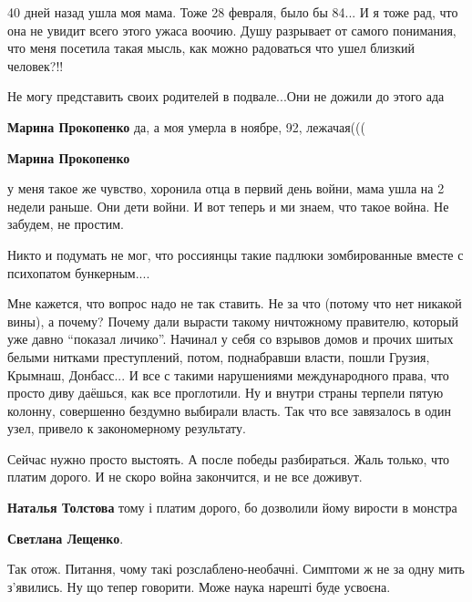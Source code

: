 \begin{itemize}
\begin{itemize}
40 дней назад ушла моя мама. Тоже 28 февраля, было бы 84... И я тоже рад, что
она не увидит всего этого ужаса воочию. Душу разрывает от самого понимания, что
меня посетила такая мысль, как можно радоваться что ушел близкий человек?!!


Не могу представить своих родителей в подвале...Они не дожили до этого ада

\textbf{Марина Прокопенко} да, а моя умерла в ноябре, 92, лежачая(((

\textbf{Марина Прокопенко} 

у меня такое же чувство, хоронила отца в первий день войни, мама ушла на 2
недели раньше. Они дети войни. И вот теперь и ми знаем, что такое война. Не
забудем, не простим.

\end{itemize} %


Никто и подумать не мог, что россиянцы такие падлюки зомбированные вместе с
психопатом бункерным....


Мне кажется, что вопрос надо не так ставить. Не за что (потому что нет никакой
вины), а почему? Почему дали вырасти такому ничтожному правителю, который уже
давно \enquote{показал личико}. Начинал у себя со взрывов домов и прочих шитых белыми
нитками преступлений, потом, поднабравши власти, пошли Грузия, Крымнаш,
Донбасс... И все с такими нарушениями международного права, что просто диву
даёшься, как все проглотили. Ну и внутри страны терпели пятую колонну,
совершенно бездумно выбирали власть. Так что все завязалось в один узел,
привело к закономерному результату.

Сейчас нужно просто выстоять. А после победы разбираться. Жаль только, что
платим дорого. И не скоро война закончится, и не все доживут.

\begin{itemize} %
\textbf{Наталья Толстова} тому і платим дорого, бо дозволили йому вирости в монстра

\textbf{Светлана Лещенко}. 

Так отож. Питання, чому такі розслаблено-необачні. Симптоми ж не за одну мить
з'явились. Ну що тепер говорити. Може наука нарешті буде усвоєна.

\end{itemize} %



\end{itemize}

